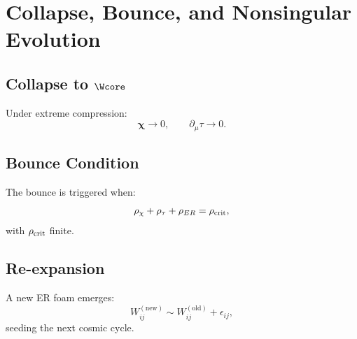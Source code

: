 \chapter{Collapse, Bounce, and Nonsingular Evolution}

\section{Collapse to $\Wcore$}

Under extreme compression:
\[
\bm{\chi}\to 0,
\qquad
\partial_\mu\tau \to 0.
\]

\section{Bounce Condition}

The bounce is triggered when:
\[
\rho_{\chi} + \rho_\tau + \rho_{ER}
=
\rho_{\rm crit},
\]
with $\rho_{\rm crit}$ finite.

\section{Re-expansion}

A new ER foam emerges:
\[
W_{ij}^{(\text{new})} \sim W_{ij}^{(\text{old})} + \epsilon_{ij},
\]
seeding the next cosmic cycle.
